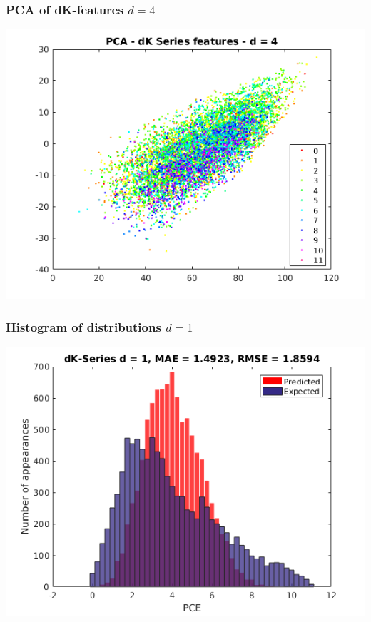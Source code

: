 \documentclass{beamer}
\begin{document}
\begin{frame}
\frametitle{PCA of dK-features $d = 4$}
\begin{justify}
\begin{center}
	\includegraphics[scale=0.5]{d4-PCA}
\end{center}
\end{justify}
\end{frame}

\begin{frame}
\frametitle{Histogram of distributions $d = 1$}
\begin{justify}
\begin{center}
	\includegraphics[scale=0.5]{d1}
\end{center}
\end{justify}
\end{frame}
\end{document}
